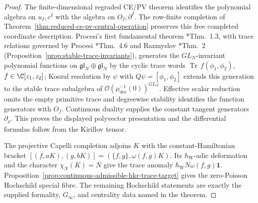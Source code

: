\documentclass[11pt]{memoir}
\begin{document}
\begin{proof}
  The finite-dimensional regraded CE/PV theorem identifies the
  polynomial algebra on \(u_I,c^I\) with the algebra on
  \(O_I,\partial^I\).  The row-finite completion of
  Theorem~\ref{thm:reduced-ce-pv-central-operation} preserves this free
  completed coordinate description.
  Procesi's first fundamental theorem \cite{procesi}*{Thm.~1.3},
  with trace relations governed by Procesi \cite{procesi}*{Thm.~4.6}
  and Razmyslov \cite{razmyslov}*{Thm.~2}
  (Proposition~\ref{prop:stable-trace-invariants}), generates the
  $GL_N$-invariant polynomial functions on $\mathfrak{gl}_N\oplus
  \mathfrak{gl}_N$ by the cyclic trace words
  $\operatorname{Tr}\,f(\phi_1,\phi_2)$, $f\in\C[z_1,z_2]$; Koszul
  resolution by $\psi$ with $Q\psi=[\phi_1,\phi_2]$ extends this
  generation to the stable trace subalgebra of
  $\mathcal O(\mu^{-1}_{\mathrm{der}}(0))^{GL_N}$.  Effective scalar
  reduction omits the empty primitive trace and degreewise stability
  identifies the function generators with \(O_f\).  Continuous duality
  supplies the constant tangent generators \(\partial_\rho\).  This
  proves the displayed polyvector presentation and the differential
  formulas follow from the Kirillov tensor.

  The projective Capelli completion
  adjoins $K$ with the constant-Hamiltonian bracket
  $[(f,aK),(g,bK)]=(\{f,g\},\omega(f,g)K)$.  Its
  \(\hbar_{\mathrm W}\)-adic deformation and the character
  \(\chi_N(K)=N\) give the trace anomaly
  \(\hbar_{\mathrm W}N\omega(f,g)\mathbf 1\).  Proposition~\ref{prop:continuous-admissible-hkr-trace-target}
  gives the zero-Poisson Hochschild special fibre.  The remaining
  Hochschild statements are exactly the supplied formality,
  \(G_\infty\), and centrality data named in the theorem.
\end{proof}
\end{document}
